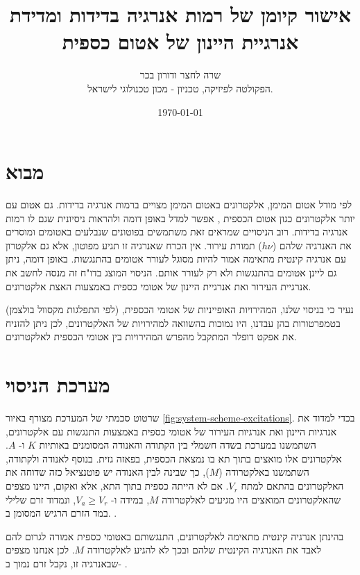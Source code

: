 \documentclass{article}
\title{
אישור קיומן של רמות אנרגיה בדידות ומדידת אנרגיית היינון של אטום כספית
}
\author{
שרה לחצר ודורון בכר \\
הפקולטה לפיזיקה, טכניון - מכון טכנולוגי לישראל.
}
\date{\today}
\newcommand*\circled[1]{\tikz[baseline=(char.base)]{
		            \node[shape=circle,draw,inner sep=1pt] (char) {#1};}}
\begin{document}
\maketitle

\begin{abstract}
\end{abstract}

\section{מבוא}

לפי מודל אטום המימן, אלקטרונים באטום המימן מצויים ברמות אנרגיה בדידות. גם אטום
עם יותר אלקטרונים כגון אטום הכספית , אפשר למדל באופן דומה ולהראות
ניסיונית שגם לו רמות אנרגיה בדידות. רוב הניסויים שמראים זאת משתמשים בפוטונים
שנבלעים באטומים ומוסרים את האנרגיה שלהם
($h \nu $)
תמורת עירור. אין הכרח
שאנרגיה זו תגיע מפוטון, אלא גם אלקטרון עם אנרגיה קינטית מתאימה אמור להיות
מסוגל לעורר אטומים בהתנגשות. באופן דומה, ניתן גם ליינן אטומים בהתנגשות ולא רק
לעורר אותם.
הניסוי המוצג בדו"ח זה מנסה לחשב את אנרגיית העירור ואת אנרגיית היינון של אטומי כספית באמצעות האצת אלקטרונים. 

נעיר כי בניסוי שלנו, המהירויות האופייניות של אטומי הכספית, (לפי התפלגות מקסוול בולצמן) בטמפרטורות בהן עבדנו, היו נמוכות בהשוואה למהירויות של האלקטרונים, לכן ניתן להזניח את אפקט דופלר המתקבל מהפרש המהירויות בין אטומי הכספית לאלקטרונים.


\section{מערכת הניסוי}

שרטוט סכמתי של המערכת מצורף באיור
\ref{fig:system-scheme-excitations}.
בכדי למדוד את אנרגיות היינון ואת אנרגיות העירור של אטומי כספית באמצעות התנגשות
עם אלקטרונים, השתמשנו במערכת בשדה חשמלי בין הקתודה והאנודה המסומנים באותיות
$K$
ו-
$A$.
אלקטרונים אלו מואצים בתוך תא בו נמצאת הכספית, בפאזה גזית. בנוסף לאנודה
ולקתודה, השתמשנו באלקטרודה 
($M$),
כך שבינה לבין האנודה יש פוטנציאל כזה שדוחה את
האלקטרונים בהתאם למתח
$V_r$.
אם לא הייתה כספית בתוך התא, אלא ואקום, היינו מצפים
שהאלקטרונים המואצים היו מגיעים לאלקטרודה
$M$,
במידה ו-
$V_a \ge  V_r$,
ונמדוד
זרם שלילי במד הזרם הרגיש המסומן ב.
\circled{pA}.

בהינתן אנרגיה קינטית מתאימה לאלקטרונים, התנגשותם באטומי כספית אמורה לגרום להם
לאבד את האנרגיה הקינטית שלהם ובכך לא להגיע לאלקטרודה $M$. לכן אנחנו מצפים
שבאנרגיה זו, נקבל זרם נמוך ב-
\circled{pA}.
\end{document}
